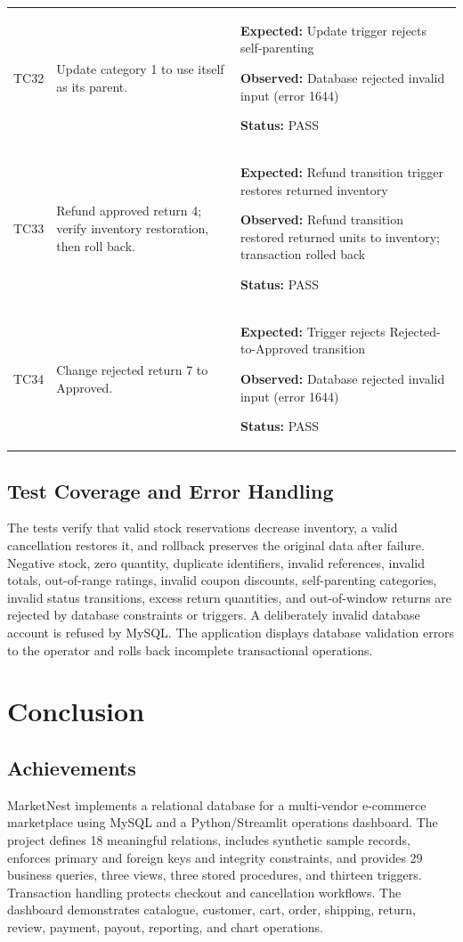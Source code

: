 \documentclass[11pt,a4paper,oneside]{report}
\begin{document}
\begin{longtable}{@{}P{13mm}P{51mm}P{92mm}@{}}
TC32 & Update category 1 to use itself as its parent. & \textbf{Expected:} Update trigger rejects self-parenting\par\textbf{Observed:} Database rejected invalid input (error 1644)\par\textbf{Status:} PASS \\
TC33 & Refund approved return 4; verify inventory restoration, then roll back. & \textbf{Expected:} Refund transition trigger restores returned inventory\par\textbf{Observed:} Refund transition restored returned units to inventory; transaction rolled back\par\textbf{Status:} PASS \\
TC34 & Change rejected return 7 to Approved. & \textbf{Expected:} Trigger rejects Rejected-to-Approved transition\par\textbf{Observed:} Database rejected invalid input (error 1644)\par\textbf{Status:} PASS \\
\end{longtable}
\normalsize

\section{Test Coverage and Error Handling}
The tests verify that valid stock reservations decrease inventory, a valid cancellation restores it, and rollback preserves the original data after failure. Negative stock, zero quantity, duplicate identifiers, invalid references, invalid totals, out-of-range ratings, invalid coupon discounts, self-parenting categories, invalid status transitions, excess return quantities, and out-of-window returns are rejected by database constraints or triggers. A deliberately invalid database account is refused by MySQL. The application displays database validation errors to the operator and rolls back incomplete transactional operations.

\chapter{Conclusion}
\section{Achievements}
MarketNest implements a relational database for a multi-vendor e-commerce marketplace using MySQL and a Python/Streamlit operations dashboard. The project defines 18 meaningful relations, includes synthetic sample records, enforces primary and foreign keys and integrity constraints, and provides 29 business queries, three views, three stored procedures, and thirteen triggers. Transaction handling protects checkout and cancellation workflows. The dashboard demonstrates catalogue, customer, cart, order, shipping, return, review, payment, payout, reporting, and chart operations.
\end{document}
